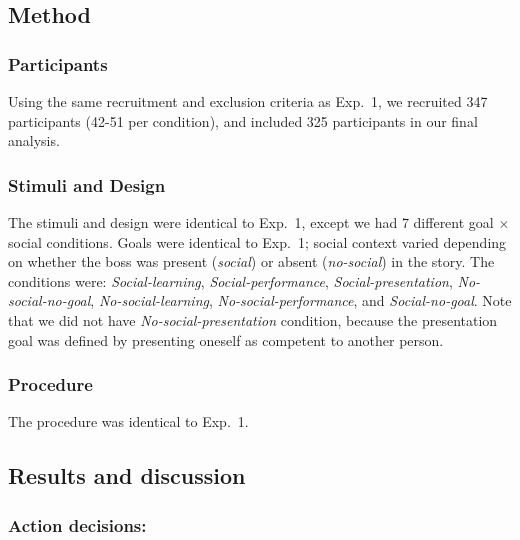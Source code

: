 \documentclass[10pt, letterpaper]{article}
\begin{document}
\subsection{Method}\label{method-1}

\subsubsection{Participants}\label{participants-1}

Using the same recruitment and exclusion criteria as Exp.~1, we
recruited 347 participants (42-51 per condition), and included 325
participants in our final analysis.

\subsubsection{Stimuli and Design}\label{stimuli-and-design-1}

The stimuli and design were identical to Exp.~1, except we had 7
different goal \(\times\) social conditions. Goals were identical to
Exp.~1; social context varied depending on whether the boss was present
(\emph{social}) or absent (\emph{no-social}) in the story. The
conditions were: \emph{Social-learning}, \emph{Social-performance},
\emph{Social-presentation}, \emph{No-social-no-goal},
\emph{No-social-learning}, \emph{No-social-performance}, and
\emph{Social-no-goal}. Note that we did not have
\emph{No-social-presentation} condition, because the presentation goal
was defined by presenting oneself as competent to another person.

\subsubsection{Procedure}\label{procedure-1}

The procedure was identical to Exp.~1.

\subsection{Results and discussion}\label{results-and-discussion-1}

\subsubsection{Action decisions:}\label{action-decisions-1}
\end{document}
